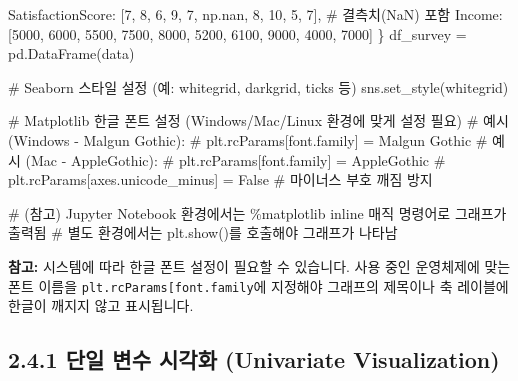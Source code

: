 \documentclass[
  letterpaper,
]{book}
\newenvironment{Shaded}{\begin{snugshade}}{\end{snugshade}}
\newcommand{\CommentTok}[1]{\textcolor[rgb]{0.37,0.37,0.37}{#1}}
\newcommand{\DecValTok}[1]{\textcolor[rgb]{0.68,0.00,0.00}{#1}}
\newcommand{\NormalTok}[1]{\textcolor[rgb]{0.00,0.23,0.31}{#1}}
\newcommand{\OperatorTok}[1]{\textcolor[rgb]{0.37,0.37,0.37}{#1}}
\newcommand{\StringTok}[1]{\textcolor[rgb]{0.13,0.47,0.30}{#1}}
\begin{document}
\begin{Shaded}
\begin{Highlighting}[]
    \StringTok{\textquotesingle{}SatisfactionScore\textquotesingle{}}\NormalTok{: [}\DecValTok{7}\NormalTok{, }\DecValTok{8}\NormalTok{, }\DecValTok{6}\NormalTok{, }\DecValTok{9}\NormalTok{, }\DecValTok{7}\NormalTok{, np.nan, }\DecValTok{8}\NormalTok{, }\DecValTok{10}\NormalTok{, }\DecValTok{5}\NormalTok{, }\DecValTok{7}\NormalTok{], }\CommentTok{\# 결측치(NaN) 포함}
    \StringTok{\textquotesingle{}Income\textquotesingle{}}\NormalTok{: [}\DecValTok{5000}\NormalTok{, }\DecValTok{6000}\NormalTok{, }\DecValTok{5500}\NormalTok{, }\DecValTok{7500}\NormalTok{, }\DecValTok{8000}\NormalTok{, }\DecValTok{5200}\NormalTok{, }\DecValTok{6100}\NormalTok{, }\DecValTok{9000}\NormalTok{, }\DecValTok{4000}\NormalTok{, }\DecValTok{7000}\NormalTok{]}
\NormalTok{\}}
\NormalTok{df\_survey }\OperatorTok{=}\NormalTok{ pd.DataFrame(data)}

\CommentTok{\# Seaborn 스타일 설정 (예: \textquotesingle{}whitegrid\textquotesingle{}, \textquotesingle{}darkgrid\textquotesingle{}, \textquotesingle{}ticks\textquotesingle{} 등)}
\NormalTok{sns.set\_style(}\StringTok{\textquotesingle{}whitegrid\textquotesingle{}}\NormalTok{)}

\CommentTok{\# Matplotlib 한글 폰트 설정 (Windows/Mac/Linux 환경에 맞게 설정 필요)}
\CommentTok{\# 예시 (Windows {-} Malgun Gothic):}
\CommentTok{\# plt.rcParams[\textquotesingle{}font.family\textquotesingle{}] = \textquotesingle{}Malgun Gothic\textquotesingle{}}
\CommentTok{\# 예시 (Mac {-} AppleGothic):}
\CommentTok{\# plt.rcParams[\textquotesingle{}font.family\textquotesingle{}] = \textquotesingle{}AppleGothic\textquotesingle{}}
\CommentTok{\# plt.rcParams[\textquotesingle{}axes.unicode\_minus\textquotesingle{}] = False \# 마이너스 부호 깨짐 방지}

\CommentTok{\# (참고) Jupyter Notebook 환경에서는 \%matplotlib inline 매직 명령어로 그래프가 출력됨}
\CommentTok{\# 별도 환경에서는 plt.show()를 호출해야 그래프가 나타남}
\end{Highlighting}
\end{Shaded}

\textbf{참고:} 시스템에 따라 한글 폰트 설정이 필요할 수 있습니다. 사용
중인 운영체제에 맞는 폰트 이름을
\texttt{plt.rcParams{[}\textquotesingle{}font.family\textquotesingle{}{]}}에
지정해야 그래프의 제목이나 축 레이블에 한글이 깨지지 않고 표시됩니다.

\subsection{2.4.1 단일 변수 시각화 (Univariate
Visualization)}\label{uxb2e8uxc77c-uxbcc0uxc218-uxc2dcuxac01uxd654-univariate-visualization}
\end{document}
